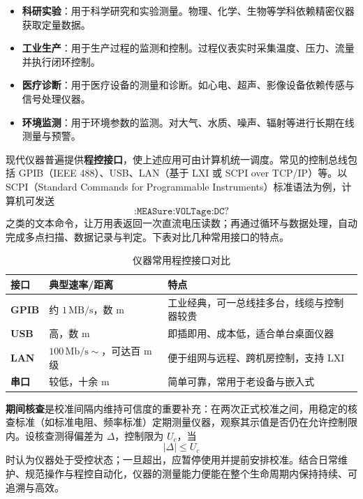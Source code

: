 \begin{itemize}
    \item \textbf{科研实验}：用于科学研究和实验测量。物理、化学、生物等学科依赖精密仪器获取定量数据。
    \item \textbf{工业生产}：用于生产过程的监测和控制。过程仪表实时采集温度、压力、流量并执行闭环控制。
    \item \textbf{医疗诊断}：用于医疗设备的测量和诊断。如心电、超声、影像设备依赖传感与信号处理仪器。
    \item \textbf{环境监测}：用于环境参数的监测。对大气、水质、噪声、辐射等进行长期在线测量与预警。
\end{itemize}

现代仪器普遍提供\textbf{程控接口}，使上述应用可由计算机统一调度。常见的控制总线包括 GPIB（IEEE 488）、USB、LAN（基于 LXI 或 SCPI over TCP/IP）等。以 SCPI（Standard Commands for Programmable Instruments）标准语法为例，计算机可发送
\[
    \texttt{:MEASure:VOLTage:DC?}
\]
之类的文本命令，让万用表返回一次直流电压读数；再通过循环与数据处理，自动完成多点扫描、数据记录与判定。下表对比几种常用接口的特点。

\begin{table}[htbp]
    \centering
    \caption{仪器常用程控接口对比}
    \begin{tabular}{|p{2.6cm}|p{3.6cm}|p{5.8cm}|}
        \hline
        \textbf{接口} & \textbf{典型速率/距离} & \textbf{特点} \\
        \hline
        \textbf{GPIB} & 约 $1\,\mathrm{MB/s}$，数 m & 工业经典，可一总线挂多台，线缆与控制器较贵 \\
        \hline
        \textbf{USB} & 高，数 m & 即插即用、成本低，适合单台桌面仪器 \\
        \hline
        \textbf{LAN} & $100\,\mathrm{Mb/s}\sim$，可达百 m 级 & 便于组网与远程、跨机房控制，支持 LXI \\
        \hline
        \textbf{串口} & 较低，十余 m & 简单可靠，常用于老设备与嵌入式 \\
        \hline
    \end{tabular}
\end{table}

\textbf{期间核查}是校准间隔内维持可信度的重要补充：在两次正式校准之间，用稳定的核查标准（如标准电阻、频率标准）定期测量仪器，观察其示值是否仍在允许控制限内。设核查测得偏差为 $\Delta$，控制限为 $U_c$，当
\[
    |\Delta| \le U_c
\]
时认为仪器处于受控状态；一旦超出，应暂停使用并提前安排校准。结合日常维护、规范操作与程控自动化，仪器的测量能力便能在整个生命周期内保持持续、可追溯与高效。

